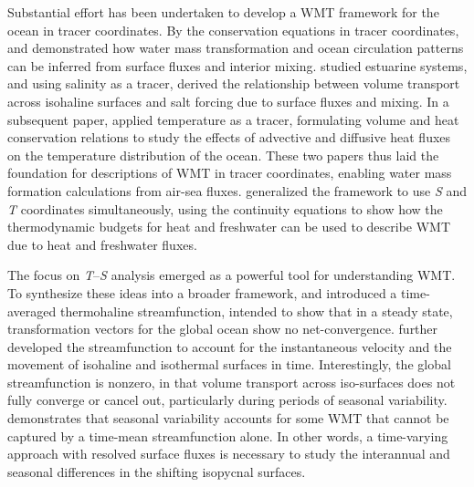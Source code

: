 \documentclass[draft]{agujournal2019}
\begin{document}
Substantial effort has been undertaken to develop a WMT framework for the ocean in tracer coordinates. By the conservation equations in tracer coordinates,  and  demonstrated how water mass transformation and ocean circulation patterns can be inferred from surface fluxes and interior mixing.  studied estuarine systems, and using salinity as a tracer, derived the relationship between volume transport across isohaline surfaces and salt forcing due to surface fluxes and mixing. In a subsequent paper,  applied temperature as a tracer, formulating volume and heat conservation relations to study the effects of advective and diffusive heat fluxes on the temperature distribution of the ocean. These two papers thus laid the foundation for descriptions of WMT in tracer coordinates, enabling water mass formation calculations from air-sea fluxes.  generalized the  framework to use \emph{S} and \emph{T} coordinates simultaneously, using the continuity equations to show how the thermodynamic budgets for heat and freshwater can be used to describe WMT due to heat and freshwater fluxes. 

The focus on \emph{T}--\emph{S} analysis emerged as a powerful tool for understanding WMT. To synthesize these ideas into a broader framework,  and  introduced a time-averaged thermohaline streamfunction, intended to show that in a steady state, transformation vectors for the global ocean show no net-convergence.  further developed the streamfunction to account for the instantaneous velocity and the movement of isohaline and isothermal surfaces in time. Interestingly, the global streamfunction is nonzero, in that volume transport across iso-surfaces does not fully converge or cancel out, particularly during periods of seasonal variability.  demonstrates that seasonal variability accounts for some WMT that cannot be captured by a time-mean streamfunction alone. In other words, a time-varying approach with resolved surface fluxes is necessary to study the interannual and seasonal differences in the shifting isopycnal surfaces.
\end{document}
